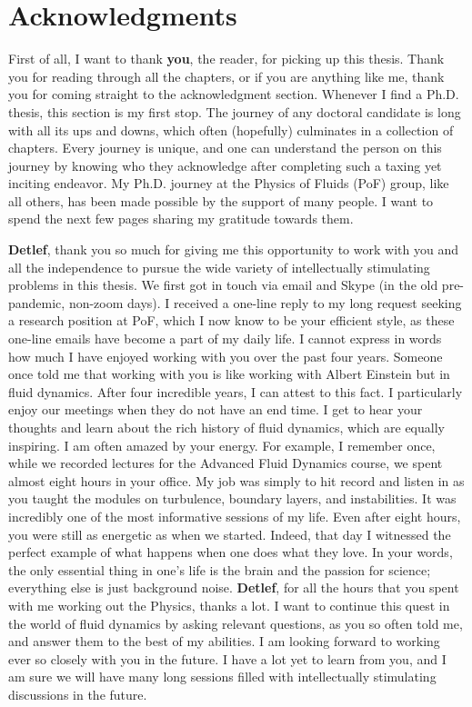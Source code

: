 \chapter{Acknowledgments}

First of all, I want to thank {\bf you}, the reader, for picking up this thesis. Thank you for reading through all the chapters, or if you are anything like me, thank you for coming straight to the acknowledgment section. Whenever I find a Ph.D. thesis, this section is my first stop. The journey of any doctoral candidate is long with all its ups and downs, which often (hopefully) culminates in a collection of chapters. Every journey is unique, and one can understand the person on this journey by knowing who they acknowledge after completing such a taxing yet inciting endeavor. My Ph.D. journey at the Physics of Fluids (PoF) group, like all others, has been made possible by the support of many people. I want to spend the next few pages sharing my gratitude towards them. 

{\bf Detlef}, thank you so much for giving me this opportunity to work with you and all the independence to pursue the wide variety of intellectually stimulating problems in this thesis. We first got in touch via email and Skype (in the old pre-pandemic, non-zoom days). I received a one-line reply to my long request seeking a research position at PoF, which I now know to be your efficient style, as these one-line emails have become a part of my daily life. I cannot express in words how much I have enjoyed working with you over the past four years. Someone once told me that working with you is like working with Albert Einstein but in fluid dynamics. After four incredible years, I can attest to this fact. I particularly enjoy our meetings when they do not have an end time. I get to hear your thoughts and learn about the rich history of fluid dynamics, which are equally inspiring. I am often amazed by your energy. For example, I remember once, while we recorded lectures for the Advanced Fluid Dynamics course, we spent almost eight hours in your office. My job was simply to hit record and listen in as you taught the modules on turbulence, boundary layers, and instabilities. It was incredibly one of the most informative sessions of my life. Even after eight hours, you were still as energetic as when we started. Indeed, that day I witnessed the perfect example of what happens when one does what they love. In your words, the only essential thing in one's life is the brain and the passion for science; everything else is just background noise. {\bf Detlef}, for all the hours that you spent with me working out the Physics, thanks a lot. I want to continue this quest in the world of fluid dynamics by asking relevant questions, as you so often told me, and answer them to the best of my abilities. I am looking forward to working ever so closely with you in the future. I have a lot yet to learn from you, and I am sure we will have many long sessions filled with intellectually stimulating discussions in the future. 

